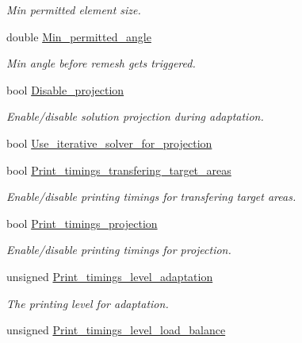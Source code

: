 \begin{DoxyCompactItemize}
\begin{DoxyCompactList}\small\item\em Min permitted element size. \end{DoxyCompactList}\item 
double \hyperlink{classoomph_1_1RefineableTriangleMesh_a7b7b3acbda9a79f8a1f0cc195dc72cb9}{Min\+\_\+permitted\+\_\+angle}
\begin{DoxyCompactList}\small\item\em Min angle before remesh gets triggered. \end{DoxyCompactList}\item 
bool \hyperlink{classoomph_1_1RefineableTriangleMesh_a7825ce22a479fecd30361ae09750f15a}{Disable\+\_\+projection}
\begin{DoxyCompactList}\small\item\em Enable/disable solution projection during adaptation. \end{DoxyCompactList}\item 
bool \hyperlink{classoomph_1_1RefineableTriangleMesh_a6b38d79f86053e7acb8f92efe06d9c9a}{Use\+\_\+iterative\+\_\+solver\+\_\+for\+\_\+projection}
\item 
bool \hyperlink{classoomph_1_1RefineableTriangleMesh_acd5c63891d8a4052ce629610697561b6}{Print\+\_\+timings\+\_\+transfering\+\_\+target\+\_\+areas}
\begin{DoxyCompactList}\small\item\em Enable/disable printing timings for transfering target areas. \end{DoxyCompactList}\item 
bool \hyperlink{classoomph_1_1RefineableTriangleMesh_ac0e10dae151eb6c03f90be0bc3462f8d}{Print\+\_\+timings\+\_\+projection}
\begin{DoxyCompactList}\small\item\em Enable/disable printing timings for projection. \end{DoxyCompactList}\item 
unsigned \hyperlink{classoomph_1_1RefineableTriangleMesh_a0b8c7af317c5279a00a13aa39ea896f2}{Print\+\_\+timings\+\_\+level\+\_\+adaptation}
\begin{DoxyCompactList}\small\item\em The printing level for adaptation. \end{DoxyCompactList}\item 
unsigned \hyperlink{classoomph_1_1RefineableTriangleMesh_ad2abc4d856b22d59ecc5640669700b31}{Print\+\_\+timings\+\_\+level\+\_\+load\+\_\+balance}

\end{DoxyCompactItemize}
